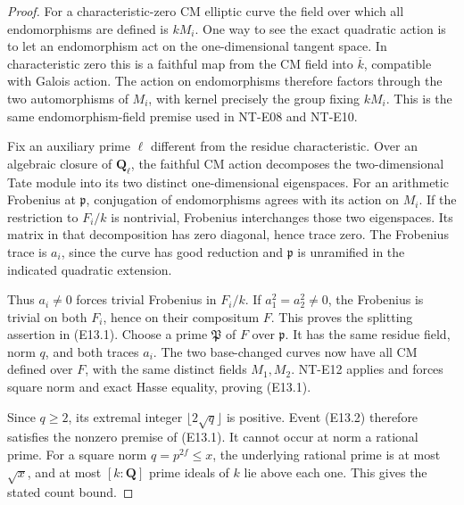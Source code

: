 \begin{proof}
For a characteristic-zero CM elliptic curve the field
over which all endomorphisms are defined is \(kM_i\).
One way to see the exact quadratic action is to let an
endomorphism act on the one-dimensional tangent space.
In characteristic zero this is a faithful map from the
CM field into \(\overline k\), compatible with Galois
action. The action on endomorphisms therefore factors
through the two automorphisms of \(M_i\), with kernel
precisely the group fixing \(kM_i\).
This is the same endomorphism-field premise used in
NT-E08 and NT-E10.

Fix an auxiliary prime \(\ell\) different from the
residue characteristic. Over an algebraic closure of
\(\mathbf Q_\ell\), the faithful CM action decomposes
the two-dimensional Tate module into its two distinct
one-dimensional eigenspaces. For an arithmetic
Frobenius at \(\mathfrak p\), conjugation of
endomorphisms agrees with its action on \(M_i\).
If the restriction to \(F_i/k\) is nontrivial, Frobenius
interchanges those two eigenspaces. Its matrix in that
decomposition has zero diagonal, hence trace zero.
The Frobenius trace is \(a_i\), since the curve has
good reduction and \(\mathfrak p\) is unramified in
the indicated quadratic extension.

Thus \(a_i\ne0\) forces trivial Frobenius in \(F_i/k\).
If \(a_1^2=a_2^2\ne0\), the Frobenius is trivial on
both \(F_i\), hence on their compositum \(F\).
This proves the splitting assertion in (E13.1).
Choose a prime \(\mathfrak P\) of \(F\) over \(\mathfrak p\).
It has the same residue field, norm \(q\), and both
traces \(a_i\). The two base-changed curves now have
all CM defined over \(F\), with the same distinct
fields \(M_1,M_2\). NT-E12 applies and forces square
norm and exact Hasse equality, proving (E13.1).

Since \(q\ge2\), its extremal integer
\(\lfloor2\sqrt q\rfloor\) is positive. Event (E13.2)
therefore satisfies the nonzero premise of (E13.1).
It cannot occur at norm a rational prime.
For a square norm \(q=p^{2f}\le x\), the underlying
rational prime is at most \(\sqrt x\), and at most
\([k:\mathbf Q]\) prime ideals of \(k\) lie above each
one. This gives the stated count bound.
\end{proof}


